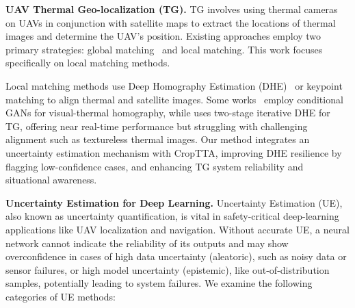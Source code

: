 \textbf{UAV Thermal Geo-localization (TG).} TG involves using thermal cameras on UAVs in conjunction with satellite maps to extract the locations of thermal images and determine the UAV's position. Existing approaches employ two primary strategies: global matching~\cite{foundloc, stl} and local matching. This work focuses specifically on local matching methods.


Local matching methods use Deep Homography Estimation (DHE)~\cite{detone2016deep, cao2022iterative, nguyen2018unsupervised, shao2021localtrans} or keypoint matching\cite{pmlr-v155-achermann21a} to align thermal and satellite images. Some works~\cite{electronics12040788, electronics12214441} employ conditional GANs for visual-thermal homography, while \cite{STHN} uses two-stage iterative DHE for TG, offering near real-time performance but struggling with challenging alignment such as textureless thermal images. Our method integrates an uncertainty estimation mechanism with CropTTA, improving DHE resilience by flagging low-confidence cases, and enhancing TG system reliability and situational awareness.

\textbf{Uncertainty Estimation for Deep Learning.}
Uncertainty Estimation (UE)\cite{gawlikowski2023survey, kendall2017uncertainties}, also known as uncertainty quantification\cite{ABDAR2021243}, is vital in safety-critical deep-learning applications like UAV localization and navigation. Without accurate UE, a neural network cannot indicate the reliability of its outputs and may show overconfidence in cases of high data uncertainty (aleatoric), such as noisy data or sensor failures, or high model uncertainty (epistemic), like out-of-distribution samples, potentially leading to system failures. We examine the following categories of UE methods:

